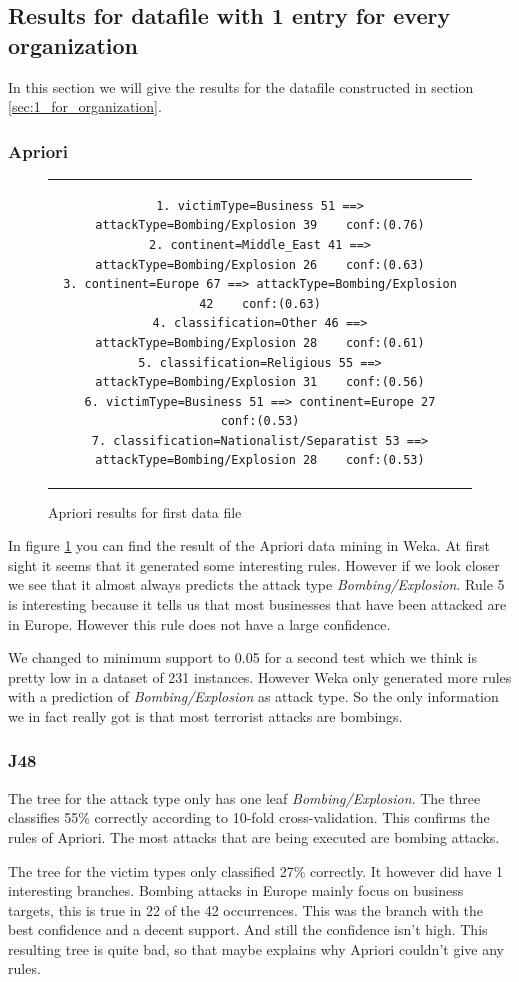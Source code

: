 \documentclass[a4]{article}
\begin{document}
\subsection{Results for datafile with 1 entry for every organization}
In this section we will give the results for the datafile constructed in section \ref{sec:1_for_organization}.
\subsubsection{Apriori}
\FloatBarrier
\begin{figure}[!h]
\centering
\begin{tabular}{c}
\begin{lstlisting}
1. victimType=Business 51 ==> attackType=Bombing/Explosion 39    conf:(0.76)
2. continent=Middle_East 41 ==> attackType=Bombing/Explosion 26    conf:(0.63)
3. continent=Europe 67 ==> attackType=Bombing/Explosion 42    conf:(0.63)
4. classification=Other 46 ==> attackType=Bombing/Explosion 28    conf:(0.61)
5. classification=Religious 55 ==> attackType=Bombing/Explosion 31    conf:(0.56)
6. victimType=Business 51 ==> continent=Europe 27    conf:(0.53)
7. classification=Nationalist/Separatist 53 ==> attackType=Bombing/Explosion 28    conf:(0.53)
\end{lstlisting}
\end{tabular}
\caption{Apriori results for first data file}
\label{fig:apriori_1}
\end{figure}
In figure \ref{fig:apriori_1} you can find the result of the Apriori data mining in Weka. At first sight it seems that it generated some interesting rules. However if we look closer we see that it almost always predicts the attack type \textit{Bombing/Explosion}. Rule 5 is interesting because it tells us that most businesses that have been attacked are in Europe. However this rule does not have a large confidence.\par
We changed to minimum support to 0.05 for a second test which we think is pretty low in a dataset of 231 instances. However Weka only generated more rules with a prediction of \textit{Bombing/Explosion} as attack type. So the only information we in fact really got is that most terrorist attacks are bombings.
\subsubsection{J48}
The tree for the attack type only has one leaf \textit{Bombing/Explosion}. The three classifies 55\% correctly according to 10-fold cross-validation. This confirms the rules of Apriori. The most attacks that are being executed are bombing attacks.\par
The tree for the victim types only classified 27\% correctly. It however did have 1 interesting branches. Bombing attacks in Europe mainly focus on business targets, this is true in 22 of the 42 occurrences. This was the branch with the best confidence and a decent support. And still the confidence isn't high. This resulting tree is quite bad, so that maybe explains why Apriori couldn't give any rules.
\end{document}
